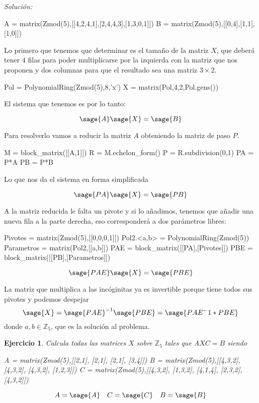 \documentclass{amsart}
\newtheorem{ejer}{Ejercicio}
\begin{document}
{\it Solución:} 


\begin{sageblock}
A = matrix(Zmod(5),[[4,2,4,1],[2,4,4,3],[1,3,0,1]])
B = matrix(Zmod(5),[[0,4],[1,1],[1,0]])
\end{sageblock}

Lo primero que tenemos que determinar es el tamaño de la matriz $X$, que deberá tener
$4$ filas para poder multiplicarse por la izquierda con la matriz que nos proponen
y dos columnas para que el resultado sea una matriz $3 \times 2$. 

\begin{sageblock}
Pol = PolynomialRing(Zmod(5),8,'x')
X = matrix(Pol,4,2,Pol.gens())
\end{sageblock}

El sistema que tenemos es por lo tanto:

$$ \sage{A} \sage{X} = \sage{B}$$

Para resolverlo vamos a reducir la matriz $A$ obteniendo la matriz de paso $P$.

\begin{sageblock}
M = block_matrix([[A,1]])
R = M.echelon_form()
P = R.subdivision(0,1)
PA = P*A
PB = P*B
\end{sageblock}

Lo que nos da el sistema en forma simplificada

$$ \sage{PA} \sage{X} = \sage{PB} $$

A la matriz reducida le falta un pivote y si lo añadimos, tenemos que añadir una
nueva fila a la parte derecha, eso corresponderá a dos parámetros libres:

\begin{sageblock}
Pivotes = matrix(Zmod(5),[[0,0,0,1]])
Pol2.<a,b> = PolynomialRing(Zmod(5))
Parametros = matrix(Pol2,[[a,b]])
PAE = block_matrix([[PA],[Pivotes]])
PBE = block_matrix([[PB],[Parametros]])
\end{sageblock}

$$ \sage{PAE} \sage{X} = \sage{PBE} $$

La matriz que multiplica a las incóginitas ya es invertible porque tiene todos
sus pivotes y podemos despejar
$$ \sage{X} = \sage{PAE}^{-1} \sage{PBE} = \sage{PAE^-1 * PBE}$$
donde $a,b \in {\mathbb Z}_5$, que es la solución al problema.


\begin{ejer}
Calcula todas las matrices $X$ sobre ${\mathbb Z}_5$ tales que $AXC = B$ siendo

\begin{sageblock}
A =  matrix(Zmod(5),[[2,1],
[2,1],
[2,1],
[3,4]])
B =  matrix(Zmod(5),[[4,3,2],
[4,3,2],
[4,3,2],
[1,2,3]])
C =  matrix(Zmod(5),[[4,3,2],
[1,3,2],
[4,1,4],
[2,3,2],
[4,3,2]])
\end{sageblock}

$$ A = \sage{A} \quad C = \sage{C} \quad B = \sage{B} $$
\end{ejer}
\end{document}
